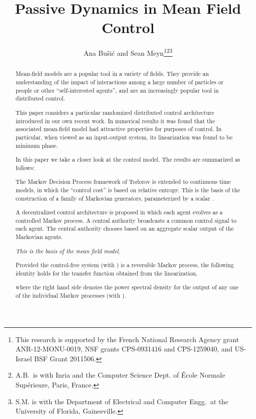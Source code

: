 \documentclass[11pt,twocolumn]{IEEEtran}
\title{\LARGE \bf
Passive Dynamics in Mean Field Control
}
\author{Ana Bu\v{s}i\'c and Sean Meyn\thanks{This research is supported by the French National Research Agency grant ANR-12-MONU-0019,  NSF grants CPS-0931416 and  CPS-1259040,   and  US-Israel BSF Grant 2011506.}\thanks{A.B.\ is with Inria and the Computer Science Dept. of \'Ecole Normale Sup\'erieure, Paris, France.}\thanks{
S.M. is with the Department of Electrical and Computer
Engg.\ at the University of Florida, Gainesville.}}
\newcounter{rmnum}
\newenvironment{romannum}{\begin{list}{{\upshape (\roman{rmnum})}}{\usecounter{rmnum}
\setlength{\leftmargin}{14pt}
\setlength{\rightmargin}{8pt}
\setlength{\itemsep}{2pt}
\setlength{\itemindent}{-1pt}
}}{\end{list}}
\begin{document}
 

\maketitle
\thispagestyle{empty}
\pagestyle{empty}




 
\begin{abstract} 

Mean-field models are a popular tool in a variety of fields.  They provide an understanding of  the
impact of interactions among a large number of particles or people or other ``self-interested agents'', and are an increasingly popular tool in distributed control.

This paper considers a particular randomized distributed control architecture introduced in our own recent work. In numerical results it was found that  the associated mean-field model had attractive properties for purposes of control.  In particular, when viewed as an input-output system, its linearization was found to be minimum phase.

In this paper we take a closer look at the control model.  The   results are summarized as follows:
\begin{romannum}
\item 
The Markov Decision Process framework of Todorov is extended to continuous time models,  in which the ``control cost'' is based on relative entropy.  This is the basis of the construction of a family of Markovian generators,  parameterized by a scalar .

\item 
A decentralized control architecture is proposed in which each agent evolves as a controlled Markov process.   A central authority broadcasts a common control signal  to each agent.    The central authority chooses   based on an  aggregate scalar output of the Markovian agents.

\textit{This is the basis of the mean field model.  }


 
\item
Provided the control-free system (with ) is a reversible Markov process, the following identity holds for the transfer function  obtained from the linearization,  

where the right hand side denotes the power spectral density for the output of any one of the 
individual Markov processes  (with ).  
\end{romannum}


\end{abstract} 
 
\end{document}
